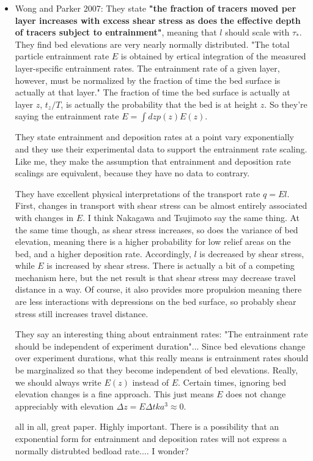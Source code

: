 \documentclass{article}
\begin{document}
\begin{itemize}
\item Wong and Parker 2007: 
They state \textbf{"the fraction of tracers moved per layer increases with excess shear stress as does the effective depth of tracers subject to entrainment"}, meaning that $l$ should scale with $\tau_*$.
They find bed elevations are very nearly normally distributed. 
"The total particle entrainment rate $E$ is obtained by ertical integration of the measured layer-specific entrainment rates. The entrainment rate of a given layer, however, must be normalized by the fraction of time the bed surface is actually at that layer." 
The fraction of time the bed surface is actually at layer $z$, $t_z/T$, is actually the probability that the bed is at height $z$. 
So they're saying the entrainment rate $E = \int dz p(z) E(z).$

They state entrainment and deposition rates at a point vary exponentially and they use their experimental data to support the entrainment rate scaling. 
Like me, they make the assumption that entrainment and deposition rate scalings are equivalent, because they have no data to contrary. 

They have excellent physical interpretations of the transport rate $q = El$. First, changes in transport with shear stress can be almost entirely associated with changes in $E$. I think Nakagawa and Tsujimoto say the same thing. At the same time though, as shear stress increases, so does the variance of bed elevation, meaning there is a higher probability for low relief areas on the bed, and a higher deposition rate. 
Accordingly, $l$ is decreased by shear stress, while $E$ is increased by shear stress. 
There is actually a bit of a competing mechanism here, but the net result is that shear stress may decrease travel distance in a way. 
Of course, it also provides more propulsion meaning there are less interactions with depressions on the bed surface, so probably shear stress still increases travel distance. 

They say an interesting thing about entrainment rates: "The entrainment rate should be independent of experiment duration"...
Since bed elevations change over experiment durations, what this really means is entrainment rates should be marginalized so that they become independent of bed elevations. Really, we should always write $E(z)$ instead of $E$. Certain times, ignoring bed elevation changes is a fine approach. This just means $E$ does not change appreciably with elevation $\Delta z = E \Delta t k a^3 \approx 0$. 

all in all, great paper. Highly important. 
There is a possibility that an exponential form for entrainment and deposition rates will not express a normally distrubted bedload rate....
I wonder? 


\end{itemize}
\end{document}
